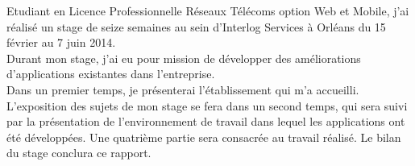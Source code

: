 

Etudiant en Licence Professionnelle Réseaux Télécoms option Web et Mobile, 
j’ai réalisé un stage de seize semaines au sein d'Interlog Services à Orléans du 15 février au 7 juin 2014.\\

Durant mon stage, j’ai eu pour mission de développer des améliorations d'applications existantes
dans l'entreprise.\\


Dans un premier temps, je présenterai l’établissement qui m’a accueilli. L’exposition
des sujets de mon stage se fera dans un second temps, qui sera suivi par la présentation de
l’environnement de travail dans lequel les applications ont été développées. Une quatrième
partie sera consacrée au travail réalisé. Le bilan du stage conclura ce rapport.



